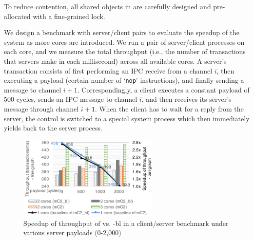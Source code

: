 To reduce contention, all shared objects in {\mCTOS} are carefully
designed and pre-allocated with a fine-grained lock.
We design a benchmark
with server/client pairs to evaluate the speedup of the system as more
cores are introduced.  
We run a pair of server/client processes on each
core, and we measure the total throughput (i.e., the number of
transactions that servers make in each millisecond) across all
available cores.
A server's transaction consists of first performing an IPC receive
from a channel $i$, then executing a payload (certain number of
`\texttt{nop}' instructions), and finally sending a message to channel
$i + 1$. Correspondingly, a client
executes a constant payload of 500 cycles, 
sends an IPC message to channel
$i$, and then receives its
server's message through channel $i + 1$.  When the client has
to wait for a reply from the server, the control is switched to a
special system process which then immediately yields back to the server
process. 

\begin{figure}\centering
	\hspace{-.2cm}
	\includegraphics[width=7cm]{figs/speedup_big_lock2.pdf}
	\hspace{-.2cm}
	\caption{Speedup of throughput of \mCTOS{} vs. {\mCTOS-bl} in a client/server benchmark under various server payloads (0-2,000)}
	\label{fig:speedup_big_lock}
        \vspace*{-10pt}
\end{figure}


